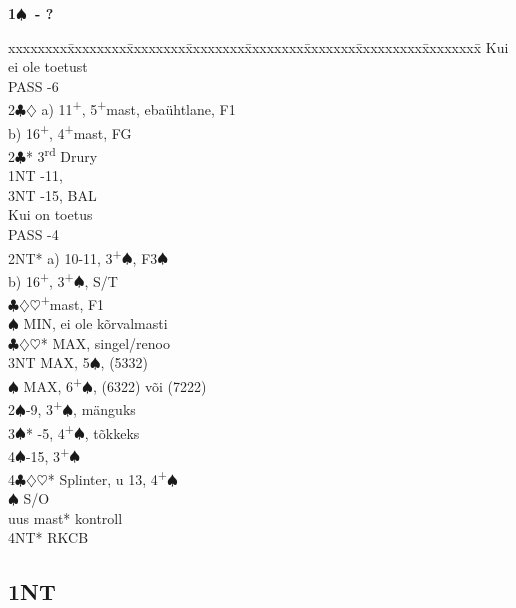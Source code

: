 \documentclass[10pt]{article}
\renewcommand{\c}{$\clubsuit$}
\renewcommand{\d}{$\diamondsuit$}
\newcommand{\h}{$\heartsuit$}
\newcommand{\s}{$\spadesuit$}
\newcommand{\p}{\textsuperscript{+}}
\newcommand{\rdh}{3\textsuperscript{rd}}
\newenvironment{bidtable}[1][]
{\textbf{#1}
  \begin{adjustwidth}{1em}{}
    \addvspace{2pt}
    \begin{tabbing}
      xxxxxxxx\=xxxxxxxx\=xxxxxxxx\=xxxxxxxx\=xxxxxxxx\=xxxxxxx\=xxxxxxxxx\=xxxxxxxx\=\kill}
{\end{tabbing}\end{adjustwidth}\bigskip}%
\begin{document}
\textbf{1\s\ - ?}
\begin{bidtable}
Kui ei ole toetust                                      \\
PASS      -6                                        \\
2\c\d     \> a) 11\p, 5\p mast, ebaühtlane, F1          \\
          \> b) 16\p, 4\p mast, FG                      \\
2\c* \rdh \> Drury                                      \\
1NT       -11,                                      \\
3NT       -15, BAL                                 \\
Kui on toetus                                           \\
PASS      -4                                        \\
2NT*      \> a) 10-11, 3\p\s, F3\s                      \\
          \> b) 16\p, 3\p\s, S/T                        \\
          \c\d\h   {}\p mast, F1                  \\
          \s       \> MIN, ei ole kõrvalmasti       \\
          \c\d\h*  \> MAX, singel/renoo             \\
          \> 3NT       \> MAX, 5\s, (5332)              \\
          \s       \> MAX, 6\p\s, (6322) või (7222) \\
2\s       {}-9, 3\p\s, mänguks                        \\
3\s*      {}-5, 4\p\s, tõkkeks                        \\
4\s       {}-15, 3\p\s                               \\
4\c\d\h*  \> Splinter, u 13, 4\p\s                      \\
          \s       \> S/O                           \\
          \> uus mast* \> kontroll                      \\
          \> 4NT*      \> RKCB
\end{bidtable}


\newpage
\subsection{1NT}
\end{document}
